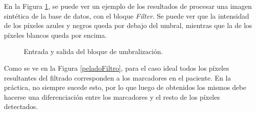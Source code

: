 En la Figura \ref{ejemploUmbralizacion}, se puede ver un ejemplo de los resultados de procesar una imagen sintética de la base de datos, con el bloque \emph{Filter}. Se puede ver que la intensidad de los píxeles azules y negros queda por debajo del umbral, mientras que la de los píxeles blancos queda por encima. %

\begin{figure}[ht!]
        \hspace{-1cm}
         \hspace{0.1cm}        
  \caption{Entrada y salida del bloque de umbralización.}
      \label{ejemploUmbralizacion}
\end{figure}

Como se ve en la Figura \ref{peladoFiltro}, para el caso ideal todos los píxeles resultantes del filtrado corresponden a los marcadores en el paciente. En la práctica, no siempre sucede esto, por lo que luego de obtenidos los mismos debe hacerse una diferenciación entre los marcadores y el resto de los píxeles detectados.

